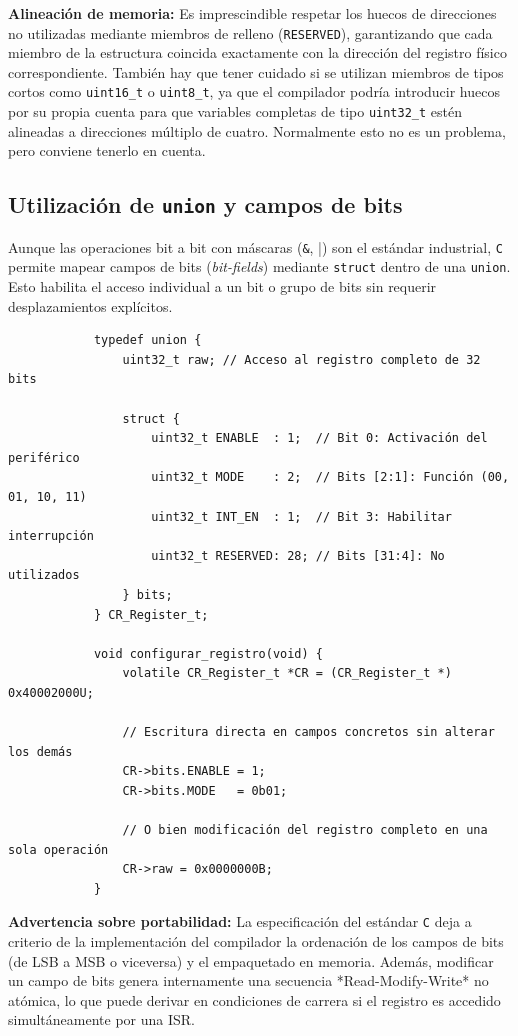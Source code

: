 \documentclass[../main.tex]{subfiles}
\begin{document}
        \textbf{Alineación de memoria:} Es imprescindible respetar los huecos de direcciones no utilizadas mediante miembros de relleno (\texttt{RESERVED}), garantizando que cada miembro de la estructura coincida exactamente con la dirección del registro físico correspondiente. También hay que tener cuidado si se utilizan miembros de tipos cortos como \lstinline|uint16_t| o \lstinline|uint8_t|, ya que el compilador podría introducir huecos por su propia cuenta para que variables completas de tipo \lstinline|uint32_t| estén alineadas a direcciones múltiplo de cuatro. Normalmente esto no es un problema, pero conviene tenerlo en cuenta.


    \subsection{Utilización de \lstinline|union| y campos de bits}

        Aunque las operaciones bit a bit con máscaras (\lstinline|&|, \lstinline|||) son el estándar industrial, \texttt{C} permite mapear campos de bits (\emph{bit-fields}) mediante \lstinline|struct| dentro de una \lstinline|union|. Esto habilita el acceso individual a un bit o grupo de bits sin requerir desplazamientos explícitos.

        \begin{lstlisting}
            typedef union {
                uint32_t raw; // Acceso al registro completo de 32 bits
                
                struct {
                    uint32_t ENABLE  : 1;  // Bit 0: Activación del periférico
                    uint32_t MODE    : 2;  // Bits [2:1]: Función (00, 01, 10, 11)
                    uint32_t INT_EN  : 1;  // Bit 3: Habilitar interrupción
                    uint32_t RESERVED: 28; // Bits [31:4]: No utilizados
                } bits;
            } CR_Register_t;

            void configurar_registro(void) {
                volatile CR_Register_t *CR = (CR_Register_t *) 0x40002000U;

                // Escritura directa en campos concretos sin alterar los demás
                CR->bits.ENABLE = 1;
                CR->bits.MODE   = 0b01;

                // O bien modificación del registro completo en una sola operación
                CR->raw = 0x0000000B;
            }
            \end{lstlisting}

        \textbf{Advertencia sobre portabilidad:} La especificación del estándar \texttt{C} deja a criterio de la implementación del compilador la ordenación de los campos de bits (de LSB a MSB o viceversa) y el empaquetado en memoria. Además, modificar un campo de bits genera internamente una secuencia *Read-Modify-Write* no atómica, lo que puede derivar en condiciones de carrera si el registro es accedido simultáneamente por una ISR.
\end{document}
